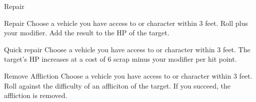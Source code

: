 \begin{abstractsection}{Repair}
\vspace{1ex}

\begin{describe}{Repair}
  Choose a vehicle you have access to or character within 3 feet. Roll  plus  your  modifier. Add the result to the HP of the target.
\end{describe}

\begin{describe}{Quick repair}
  Choose a vehicle you have access to or character within 3 feet. The target's HP increases at a cost of 6 scrap minus your  modifier per hit point.
\end{describe}

\begin{describe}{Remove Affliction}
  Choose a vehicle you have access to or character within 3 feet. Roll  against the difficulty of an affliciton of the target.  If you succeed, the affliction is removed.
\end{describe}
\end{abstractsection}
